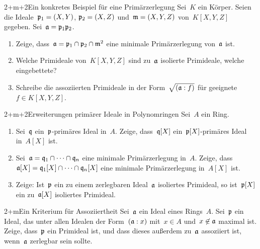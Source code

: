 \documentclass{uebblatt}
\begin{document}

\begin{aufgabe}{2+m+2}{Ein konkretes Beispiel für eine Primärzerlegung}
Sei~$K$ ein Körper. Seien die Ideale~$\mathfrak{p}_1 = (X,Y)$, $\mathfrak{p}_2 = (X,Z)$
und~$\mathfrak{m} = (X,Y,Z)$ von~$K[X,Y,Z]$ gegeben. Sei~$\mathfrak{a} = \mathfrak{p}_1 \mathfrak{p}_2$.
\begin{enumerate}
\item Zeige, dass~$\mathfrak{a} = \mathfrak{p}_1 \cap \mathfrak{p}_2 \cap \mathfrak{m}^2$ eine minimale
Primärzerlegung von~$\mathfrak{a}$ ist.
\item Welche Primideale von~$K[X,Y,Z]$ sind zu~$\mathfrak{a}$
isolierte Primideale, welche eingebettete?
\item Schreibe die assoziierten Primideale in der Form~$\sqrt{(\mathfrak{a}:f)}$ für
geeignete~$f \in K[X,Y,Z]$.
\end{enumerate}
\end{aufgabe}

\begin{aufgabe}{2+m+2}{Erweiterungen primärer Ideale in Polynomringen}
Sei~$A$ ein Ring.
\begin{enumerate}
\item Sei~$\mathfrak{q}$ ein~$\mathfrak{p}$-primäres Ideal
in~$A$. Zeige, dass~$\mathfrak{q}[X]$ ein~$\mathfrak{p}[X]$-primäres Ideal in~$A[X]$ ist.
\item Sei~$\mathfrak{a} = \mathfrak{q}_1 \cap \cdots \cap \mathfrak{q}_n$ eine minimale Primärzerlegung
in~$A$. Zeige, dass~$\mathfrak{a}[X] = \mathfrak{q}_1[X] \cap \cdots \cap \mathfrak{q}_n[X]$ eine
minimale Primärzerlegung in~$A[X]$ ist.
\item Zeige: Ist~$\mathfrak{p}$ ein zu einem zerlegbaren Ideal~$\mathfrak{a}$ isoliertes Primideal, so
ist~$\mathfrak{p}[X]$ ein zu~$\mathfrak{a}[X]$ isoliertes Primideal.
\end{enumerate}
\end{aufgabe}

\begin{aufgabe}{2+m}{Ein Kriterium für Assoziiertheit}
Sei~$\mathfrak{a}$ ein Ideal eines Rings~$A$.
Sei~$\mathfrak{p}$ ein Ideal, das unter allen Idealen der Form~$(\mathfrak{a}:x)$ mit~$x
\in A$ und~$x \not\in \mathfrak{a}$ maximal ist.
Zeige, dass~$\mathfrak{p}$ ein Primideal ist, und dass dieses außerdem zu~$\mathfrak{a}$
assoziiert ist, wenn~$\mathfrak{a}$ zerlegbar sein sollte.
\end{aufgabe}
\end{document}
